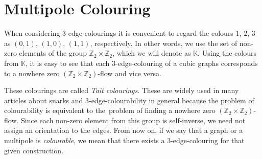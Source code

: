 \section{Multipole Colouring}\label{sec:multipole-colouring}


When considering $3$-edge-colourings it is convenient to regard the colours $1$, $2$, $3$ as $(0, 1)$, $(1, 0)$, $(1,1)$, respectively. In other words, we use the set of non-zero elements of the group $\mathbb{Z}_2\times\mathbb{Z}_2$, which we will denote as $\mathbb{K}$. Using the colours from $\mathbb{K}$, it is easy to see that each $3$-edge-colouring of a cubic graphs corresponds to a nowhere zero $(\mathbb{Z}_2\times\mathbb{Z}_2)$-flow and vice versa.

	

These colourings are called \textit{Tait colourings}. These are widely used in many articles about snarks and 3-edge-colourability in general because the problem of colourability is equivalent to the~problem of finding a nowhere zero $(\mathbb{Z}_2\times\mathbb{Z}_2)$-flow. Since each non-zero element from this group is self-inverse, we need not assign an orientation to the edges. From now on, if we say that a graph or a multipole is \textit{colourable}, we mean that there exists a 3-edge-colouring for that given construction.


